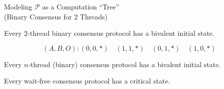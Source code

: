 \begin{frame}{}
  \begin{center}
    Modeling $\mathcal{P}$ as a Computation ``Tree'' \\[2pt]
    {\small (Binary Consensus for $2$ Threads)}
  \end{center}
  
\end{frame}

\begin{frame}{}
  \begin{theorem}
    Every $2$-thread binary consensus protocol has a bivalent initial state.
  \end{theorem}

  \pause
  \[
    (A, B, O): (0,0,\ast) \quad (1,1,\ast) \quad (0,1,\ast) \quad (1,0,\ast)
  \]

  \pause
\end{frame}

\begin{frame}{}
  \begin{lemma}
    Every $n$-thread (binary) consensus protocol has a bivalent initial state.
  \end{lemma}

  \pause
  \vspace{0.30cm}
  \begin{theorem}
    Every wait-free consensus protocol has a critical state.
  \end{theorem}

  \pause
\end{frame}

\begin{frame}{}
\end{frame}
